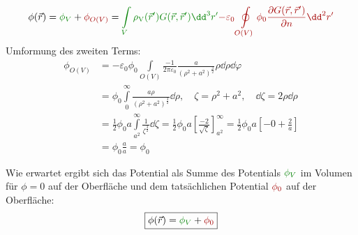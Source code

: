 			        $$
				        \phi(\vec{r} ) = \textcolor{green}{\phi_V} + \textcolor{red}{\phi_{O(V)}} = \textcolor{green}{\int\limits_V
					        \rho_\text{V}(\vec{r}' ) G(\vec{r} ,\vec{r}' ) \dd^3 r'} \textcolor{red}{- \varepsilon_0 \oint\limits_{O(V)} \phi_0 \frac{\partial G(\vec{r} ,\vec{r}' )}{\partial n} \dd^2r'}
			        $$
			   Umformung des zweiten Terms:
			        \begin{equation}\begin{split}\nonumber
					        \phi_{O(V)} &= -\varepsilon_0\phi_0 \int\limits_{O(V)} \frac{-1}{2\pi\varepsilon_0} \frac{a}{(\rho^2 + a^2 )^{\frac{3}{2}}} \rho\dd\rho\dd\varphi \\
					        &=  \phi_0 \int\limits_0^\infty  \frac{a\rho}{(\rho^2 + a^2 )^{\frac{3}{2}}} \dd\rho, \quad \zeta = \rho^2+a^2, \quad \dd \zeta = 2\rho\dd \rho \\
					        & = \frac{1}{2} \phi_0 a \int\limits_{a^2}^\infty \frac{1}{\zeta^{\frac{3}{2}}} \dd\zeta =  \frac{1}{2} \phi_0 a  \left[ \frac{-2}{\sqrt{\zeta}}  \right]_{a^2}^{\infty} =  \frac{1}{2} \phi_0 a  \left[ -0 + \frac{2}{a}  \right] \\
					        &=  \phi_0  \frac{a}{a} =  \phi_0
				        \end{split}\end{equation}

			   Wie erwartet ergibt sich das Potential als Summe des Potentials $ \textcolor{green}{\phi_V}$ im Volumen für $\phi=0$ auf der Oberfläche und dem tatsächlichen Potential $\textcolor{red}{\phi_0}$ auf der Oberfläche:
			   \begin{equation}\boxed{\phi(\vec{r} ) = \textcolor{green}{\phi_V} + \textcolor{red}{\phi_0}}\end{equation}
